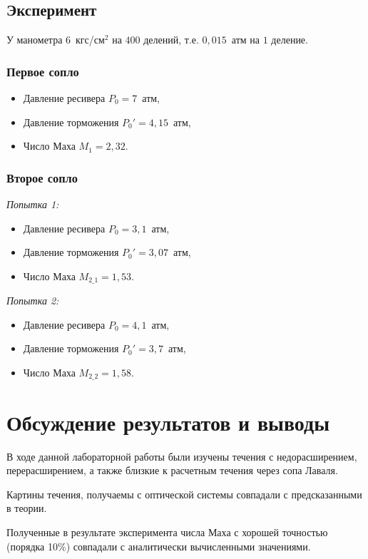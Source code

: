 \documentclass[12pt,a4paper]{article}
\begin{document}
\subsection{Эксперимент}

У манометра $6$~кгс/см$^2$ на $400$ делений, т.е. $0,015$~атм на $1$ деление.

\subsubsection{Первое сопло}

\begin{itemize}
    \item Давление ресивера $P_0 = 7$~атм,
    \item Давление торможения $P_0' = 4,15$~атм,
    \item Число Маха $M_1 = 2,32$.
\end{itemize}

\subsubsection{Второе сопло}

\textit{Попытка 1:}

\begin{itemize}
    \item Давление ресивера $P_0 = 3,1$~атм,
    \item Давление торможения $P_0' = 3,07$~атм,
    \item Число Маха $M_{2\_1} = 1,53$.
\end{itemize}

\textit{Попытка 2:}

\begin{itemize}
    \item Давление ресивера $P_0 = 4,1$~атм,
    \item Давление торможения $P_0' = 3,7$~атм,
    \item Число Маха $M_{2\_2} = 1,58$.
\end{itemize}

\section{ Обсуждение результатов и выводы}
В ходе данной лабораторной работы были изучены течения с недорасширением, перерасширением, а также близкие к расчетным течения через сопа Лаваля.

Картины течения, получаемы с оптической системы совпадали с предсказанными в теории.

Полученные в результате эксперимента числа Маха с хорошей точностью (порядка 10\%)
совпадали с аналитически вычисленными значениями.
\end{document}
